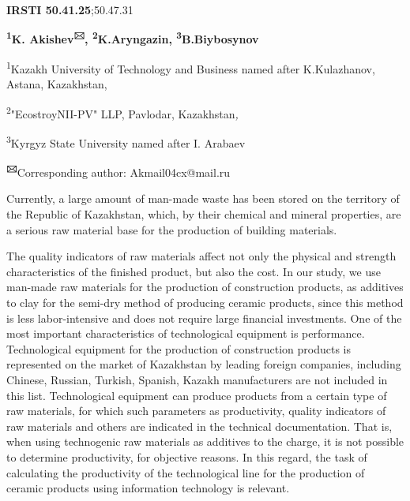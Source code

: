 \newpage
{\bfseries IRSTI 50.41.25};50.47.31


\begin{center}
{\bfseries \textsuperscript{1}K. Akishev\textsuperscript{🖂},
\textsuperscript{2}K.Aryngazin, \textsuperscript{3}B.Biybosynov}

\textsuperscript{1}Kazakh University of Technology and Business named
after K.Kulazhanov, Astana, Kazakhstan,

\textsuperscript{2}"EcostroyNII-PV" LLP, Pavlodar, Kazakhstan\emph{,}

\textsuperscript{3}Kyrgyz State University named after I. Arabaev

{\bfseries \textsuperscript{🖂}}Corresponding author: Akmail04cx@mail.ru

Currently, a large amount of man-made waste has been stored on the
territory of the Republic of Kazakhstan, which, by their chemical and
mineral properties, are a serious raw material base for the production
of building materials.
\end{center}
The quality indicators of raw materials affect not only the physical and
strength characteristics of the finished product, but also the cost. In
our study, we use man-made raw materials for the production of
construction products, as additives to clay for the semi-dry method of
producing ceramic products, since this method is less labor-intensive
and does not require large financial investments. One of the most
important characteristics of technological equipment is performance.
Technological equipment for the production of construction products is
represented on the market of Kazakhstan by leading foreign companies,
including Chinese, Russian, Turkish, Spanish, Kazakh manufacturers are
not included in this list. Technological equipment can produce products
from a certain type of raw materials, for which such parameters as
productivity, quality indicators of raw materials and others are
indicated in the technical documentation. That is, when using
technogenic raw materials as additives to the charge, it is not possible
to determine productivity, for objective reasons. In this regard, the
task of calculating the productivity of the technological line for the
production of ceramic products using information technology is relevant.

